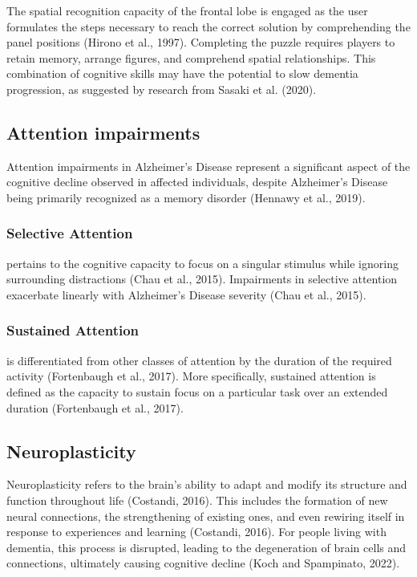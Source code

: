 \documentclass{l4proj}
\begin{document}
The spatial recognition capacity of the frontal lobe is engaged as the user formulates the steps necessary to reach the correct solution by comprehending the panel positions (Hirono et al., 1997). Completing the puzzle requires players to retain memory, arrange figures, and comprehend spatial relationships. This combination of cognitive skills may have the potential to slow dementia progression, as suggested by research from Sasaki et al. (2020).


\subsection{Attention impairments}\label{sec:attention}
Attention impairments in Alzheimer’s Disease represent a significant aspect of the cognitive decline observed in affected individuals, despite Alzheimer’s Disease being primarily recognized as a memory disorder (Hennawy et al., 2019).

\subsubsection{Selective Attention}
pertains to the cognitive capacity to focus on a singular stimulus while ignoring surrounding distractions (Chau et al., 2015). Impairments in selective attention exacerbate linearly with Alzheimer’s Disease severity (Chau et al., 2015).

\subsubsection{Sustained Attention} is differentiated from other classes of attention by the duration of the required activity (Fortenbaugh et al., 2017). More specifically, sustained attention is defined as the capacity to sustain focus on a particular task over an extended duration (Fortenbaugh et al., 2017).

\subsection{Neuroplasticity}\label{sec:neuroplasticity}
Neuroplasticity refers to the brain's ability to adapt and modify its structure and function throughout life (Costandi, 2016). This includes the formation of new neural connections, the strengthening of existing ones, and even rewiring itself in response to experiences and learning (Costandi, 2016). For people living with dementia, this process is disrupted, leading to the degeneration of brain cells and connections, ultimately causing cognitive decline (Koch and Spampinato, 2022).
\end{document}
